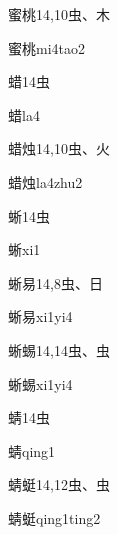 \begin{Entry}{蜜桃}{14,10}{⾍、⽊}
  \begin{Phonetics}{蜜桃}{mi4tao2}
  \end{Phonetics}
\end{Entry}

\begin{Entry}{蜡}{14}{⾍}
  \begin{Phonetics}{蜡}{la4}
  \end{Phonetics}
\end{Entry}

\begin{Entry}{蜡烛}{14,10}{⾍、⽕}
  \begin{Phonetics}{蜡烛}{la4zhu2}
  \end{Phonetics}
\end{Entry}

\begin{Entry}{蜥}{14}{⾍}
  \begin{Phonetics}{蜥}{xi1}
  \end{Phonetics}
\end{Entry}

\begin{Entry}{蜥易}{14,8}{⾍、⽇}
  \begin{Phonetics}{蜥易}{xi1yi4}
  \end{Phonetics}
\end{Entry}

\begin{Entry}{蜥蜴}{14,14}{⾍、⾍}
  \begin{Phonetics}{蜥蜴}{xi1yi4}
  \end{Phonetics}
\end{Entry}

\begin{Entry}{蜻}{14}{⾍}
  \begin{Phonetics}{蜻}{qing1}
  \end{Phonetics}
\end{Entry}

\begin{Entry}{蜻蜓}{14,12}{⾍、⾍}
  \begin{Phonetics}{蜻蜓}{qing1ting2}
  \end{Phonetics}
\end{Entry}

